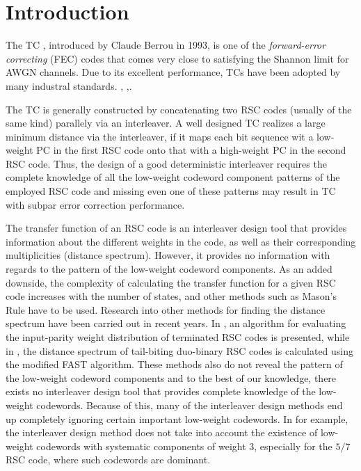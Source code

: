 \section{Introduction}
The TC \cite{Berrou93-05C}, introduced by Claude Berrou in 1993, is one of the \textit{forward-error correcting} (FEC) codes that comes very close to satisfying the Shannon limit for AWGN channels. Due to its excellent performance, TCs have been adopted by many industral standards. \cite{802-16e-04S}, \cite{dvb-rcs2-S},\cite{LTE-S}.

The TC is generally constructed by concatenating two RSC codes (usually of the same kind) parallely  via an interleaver. A well designed TC realizes a large minimum distance via the interleaver, if it maps each bit sequence wit a  low-weight PC in the first RSC code onto that with a high-weight PC in the second RSC code.
Thus, the design of a good deterministic interleaver requires the complete knowledge of all the low-weight codeword component patterns of the employed RSC code and missing even one of these patterns may result in TC with subpar error correction performance.

The transfer function of an RSC code is an interleaver design tool that provides information about the different weights in the code, as well as their corresponding multiplicities (distance spectrum). 
However, it provides no information with regards to the pattern of the low-weight codeword components. As an added downside, the complexity of calculating the transfer function for a given RSC code increases with the number of states, and other methods such as Mason's Rule \cite{Moon05B} have to be used. Research into other methods for finding the distance spectrum have been carried out in recent years.  In \cite{Lu16-10C}, an algorithm for evaluating the input-parity weight distribution of
terminated RSC codes is presented, while in \cite{Deng17-01C}, the distance spectrum of tail-biting duo-binary
RSC codes is calculated using the modified FAST algorithm. These methods also do not reveal the pattern of the low-weight codeword components and to the best of our knowledge, there exists no interleaver design tool that provides complete knowledge of the low-weight codewords. Because of this, many of the interleaver design methods end up completely ignoring certain important low-weight codewords. In \cite{Sun05-01J} for example, the interleaver design method does not take into account the existence of low-weight codewords with systematic components of weight 3, especially for the $5/7$  RSC code, where such codewords are dominant.


